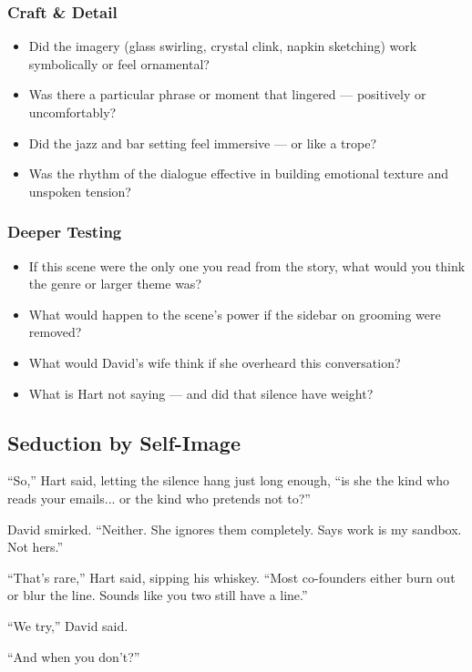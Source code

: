 \subsubsection{Craft \& Detail}

\begin{itemize}
\item Did the imagery (glass swirling, crystal clink, napkin sketching) work symbolically or feel ornamental?
\item Was there a particular phrase or moment that lingered — positively or uncomfortably?
\item Did the jazz and bar setting feel immersive — or like a trope?
\item Was the rhythm of the dialogue effective in building emotional texture and unspoken tension?
\end{itemize}

\subsubsection{Deeper Testing}

\begin{itemize}
\item If this scene were the only one you read from the story, what would you think the genre or larger theme was?
\item What would happen to the scene’s power if the sidebar on grooming were removed?
\item What would David’s wife think if she overheard this conversation?
\item What is Hart not saying — and did that silence have weight?
\end{itemize}


\subsection{Seduction by Self-Image}

“So,” Hart said, letting the silence hang just long enough, “is she the kind who reads your 
emails... or the kind who pretends not to?”

David smirked. “Neither. She ignores them completely. Says work is my sandbox. Not hers.”

“That’s rare,” Hart said, sipping his whiskey. “Most co-founders either burn out or blur the 
line. Sounds like you two still have a line.”

“We try,” David said.

“And when you don’t?”

